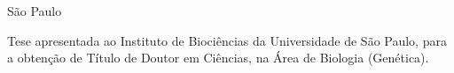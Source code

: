 \pagestyle{empty}


\begin{titlepage}

\addtolength{\wpXoffset}{0.78cm}

\begin{center}
\hspace*{15pt} {\LARGE \nomedoaluno}
\par
\vspace{40pt}
\hspace{15pt}  {\huge \titulo}
\par
\vspace{450pt}
\hspace*{10pt} {\Large São Paulo}\\
\hspace*{10pt} {\Large \the\year}
\end{center}
\end{titlepage}

\cleardoublepage

\pagestyle{fancy}
\fancyhead{} %
\fancyhead[LE,RO]{\thepage}



\thispagestyle{empty}

\begin{center}
{\LARGE \nomedoaluno}
\par
\vspace{120pt}
{\Huge \titulo}
\par
\vspace{80pt}
{\huge \tituloEN}
\end{center}
\par
\vspace{70pt}
\hspace*{175pt}\parbox{7.6cm}{{\large Tese apresentada ao Instituto de Biociências da Universidade de São Paulo, para a obtenção de Título de Doutor em Ciências, na Área de Biologia (Genética).}}

